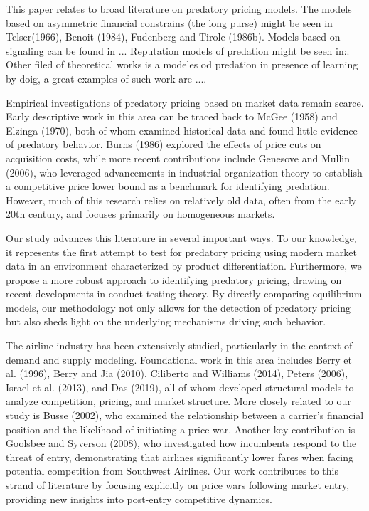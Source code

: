 \documentclass[12pt,oneside]{article}
\theoremstyle{definition}
\theoremstyle{remark}
\begin{document}
This paper relates to broad literature on predatory pricing models. The models based on asymmetric financial constrains (the long purse) might be seen in Telser(1966), Benoit (1984), Fudenberg and Tirole (1986b). Models based on signaling can be found in ... Reputation models of predation might be seen in:. Other filed of theoretical works is a modeles od predation in presence of learning by doig, a great examples of such work are ....


Empirical investigations of predatory pricing based on market data remain scarce. Early descriptive work in this area can be traced back to McGee (1958) and Elzinga (1970), both of whom examined historical data and found little evidence of predatory behavior. Burns (1986) explored the effects of price cuts on acquisition costs, while more recent contributions include Genesove and Mullin (2006), who leveraged advancements in industrial organization theory to establish a competitive price lower bound as a benchmark for identifying predation. However, much of this research relies on relatively old data, often from the early 20th century, and focuses primarily on homogeneous markets.

Our study advances this literature in several important ways. To our knowledge, it represents the first attempt to test for predatory pricing using modern market data in an environment characterized by product differentiation. Furthermore, we propose a more robust approach to identifying predatory pricing, drawing on recent developments in conduct testing theory. By directly comparing equilibrium models, our methodology not only allows for the detection of predatory pricing but also sheds light on the underlying mechanisms driving such behavior.

The airline industry has been extensively studied, particularly in the context of demand and supply modeling. Foundational work in this area includes Berry et al. (1996), Berry and Jia (2010), Ciliberto and Williams (2014), Peters (2006), Israel et al. (2013), and Das (2019), all of whom developed structural models to analyze competition, pricing, and market structure. More closely related to our study is Busse (2002), who examined the relationship between a carrier’s financial position and the likelihood of initiating a price war. Another key contribution is Goolsbee and Syverson (2008), who investigated how incumbents respond to the threat of entry, demonstrating that airlines significantly lower fares when facing potential competition from Southwest Airlines. Our work contributes to this strand of literature by focusing explicitly on price wars following market entry, providing new insights into post-entry competitive dynamics.
\end{document}
